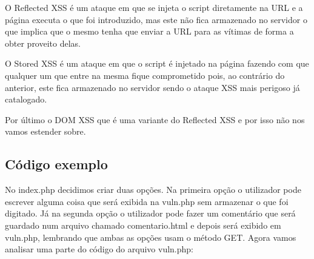 \documentclass{report}
\begin{document}
O Reflected XSS é um ataque em que se injeta o script diretamente na URL e a página executa o que foi introduzido, mas este não fica armazenado no servidor o que implica que o mesmo tenha que enviar a URL para as vítimas de forma a obter proveito delas. 

O Stored XSS é um ataque em que o script é injetado na página fazendo com que qualquer um que entre na mesma fique comprometido pois, ao contrário do anterior, este fica armazenado no servidor sendo o ataque XSS mais perigoso já catalogado.

Por último o DOM XSS que é uma variante do Reflected XSS e por isso não nos vamos estender sobre.
\cite{cia-nasa}	
\clearpage
\subsection{Código exemplo}

 No index.php decidimos criar duas opções. Na primeira opção o utilizador pode escrever alguma coisa que será exibida na vuln.php sem armazenar o que foi digitado. Já na segunda opção o utilizador pode fazer um comentário que será guardado num arquivo chamado comentario.html e depois será exibido em vuln.php, lembrando que ambas as opções usam o método GET.
Agora vamos analisar uma parte do código do arquivo vuln.php:
\end{document}
